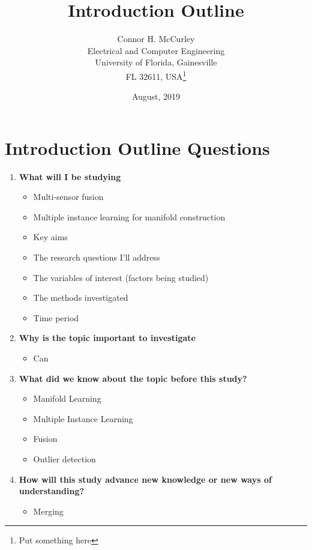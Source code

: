 \documentclass{article}[10 pt]
\begin{document}
\title{Introduction Outline}
\date{August, 2019}
\author{Connor H. McCurley\\ Electrical and Computer Engineering\\ University of Florida, Gainesville\\FL 32611, USA\thanks{Put something here}}

\maketitle

\section*{Introduction Outline Questions}

\begin{enumerate}
\item \textbf{What will I be studying}
	\begin{itemize}
		\item Multi-sensor fusion
		\item Multiple instance learning for manifold construction
		\item Key aims
		\item The research questions I'll address
		\item The variables of interest (factors being studied)
		\item The methods investigated
		\item Time period
	\end{itemize}

\item \textbf{Why is the topic important to investigate}
\begin{itemize}
		\item Can 
	\end{itemize}

\item \textbf{What did we know about the topic before this study?}
\begin{itemize}
		\item Manifold Learning
		\item Multiple Instance Learning
		\item Fusion
		\item Outlier detection
	\end{itemize}

\item \textbf{How will this study advance new knowledge or new ways of understanding?}
\begin{itemize}
		\item Merging
	\end{itemize}

\end{enumerate}
\end{document}
